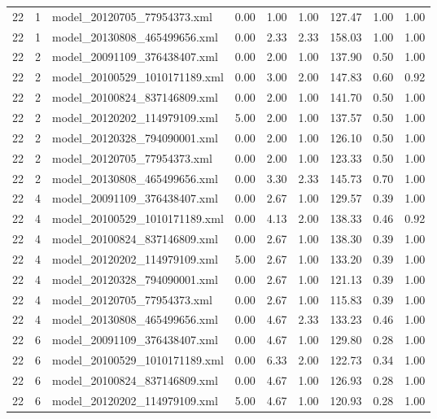 \begin{table}[ht]
\begin{tabular}{rrlrrrrrr}
   22 &   1 & model\_20120705\_77954373.xml & 0.00 & 1.00 & 1.00 & 127.47 & 1.00 & 1.00 \\ 
   22 &   1 & model\_20130808\_465499656.xml & 0.00 & 2.33 & 2.33 & 158.03 & 1.00 & 1.00 \\ 
   22 &   2 & model\_20091109\_376438407.xml & 0.00 & 2.00 & 1.00 & 137.90 & 0.50 & 1.00 \\ 
   22 &   2 & model\_20100529\_1010171189.xml & 0.00 & 3.00 & 2.00 & 147.83 & 0.60 & 0.92 \\ 
   22 &   2 & model\_20100824\_837146809.xml & 0.00 & 2.00 & 1.00 & 141.70 & 0.50 & 1.00 \\ 
   22 &   2 & model\_20120202\_114979109.xml & 5.00 & 2.00 & 1.00 & 137.57 & 0.50 & 1.00 \\ 
   22 &   2 & model\_20120328\_794090001.xml & 0.00 & 2.00 & 1.00 & 126.10 & 0.50 & 1.00 \\ 
   22 &   2 & model\_20120705\_77954373.xml & 0.00 & 2.00 & 1.00 & 123.33 & 0.50 & 1.00 \\ 
   22 &   2 & model\_20130808\_465499656.xml & 0.00 & 3.30 & 2.33 & 145.73 & 0.70 & 1.00 \\ 
   22 &   4 & model\_20091109\_376438407.xml & 0.00 & 2.67 & 1.00 & 129.57 & 0.39 & 1.00 \\ 
   22 &   4 & model\_20100529\_1010171189.xml & 0.00 & 4.13 & 2.00 & 138.33 & 0.46 & 0.92 \\ 
   22 &   4 & model\_20100824\_837146809.xml & 0.00 & 2.67 & 1.00 & 138.30 & 0.39 & 1.00 \\ 
   22 &   4 & model\_20120202\_114979109.xml & 5.00 & 2.67 & 1.00 & 133.20 & 0.39 & 1.00 \\ 
   22 &   4 & model\_20120328\_794090001.xml & 0.00 & 2.67 & 1.00 & 121.13 & 0.39 & 1.00 \\ 
   22 &   4 & model\_20120705\_77954373.xml & 0.00 & 2.67 & 1.00 & 115.83 & 0.39 & 1.00 \\ 
   22 &   4 & model\_20130808\_465499656.xml & 0.00 & 4.67 & 2.33 & 133.23 & 0.46 & 1.00 \\ 
   22 &   6 & model\_20091109\_376438407.xml & 0.00 & 4.67 & 1.00 & 129.80 & 0.28 & 1.00 \\ 
   22 &   6 & model\_20100529\_1010171189.xml & 0.00 & 6.33 & 2.00 & 122.73 & 0.34 & 1.00 \\ 
   22 &   6 & model\_20100824\_837146809.xml & 0.00 & 4.67 & 1.00 & 126.93 & 0.28 & 1.00 \\ 
   22 &   6 & model\_20120202\_114979109.xml & 5.00 & 4.67 & 1.00 & 120.93 & 0.28 & 1.00 \\ 

\end{tabular}
\end{table}
